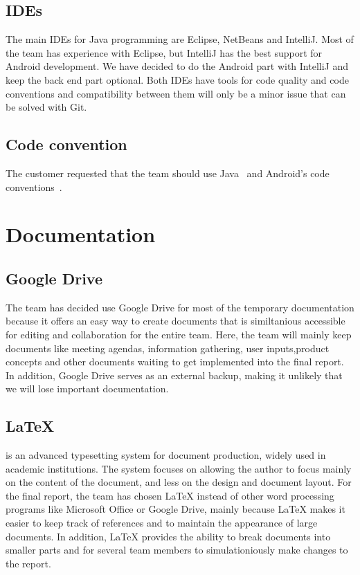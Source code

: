 \subsection{IDEs}
The main IDEs for Java programming are Eclipse, NetBeans and IntelliJ. Most of the team has experience with Eclipse, but IntelliJ has the best support for Android development.
We have decided to do the Android part with IntelliJ and keep the back end part optional. Both IDEs have tools for code quality and code conventions and compatibility between them will only be a minor issue that can be solved with Git.

\subsection{Code convention}
The customer requested that the team should use Java~\cite{javaconv} and Android's code conventions~\cite{androidconv}.

\section{Documentation}

\subsection{Google Drive}
The team has decided use Google Drive for most of the temporary documentation because it offers an easy way to create 
documents that is similtanious accessible for editing and collaboration for the entire team. Here, the team will mainly 
keep documents like meeting agendas, information gathering, user inputs,product concepts and other documents 
waiting to get implemented into the final report. 
In addition, Google Drive serves as an external backup, making it unlikely that we will lose important documentation. 


\subsection{\LaTeX}
\latex is an advanced typesetting system for document production, widely used in
academic institutions. The system focuses on allowing the author to focus mainly on the content of the document, 
and less on the design and document layout.
For the final report, the team has chosen LaTeX instead of other word processing programs like Microsoft Office or 
Google Drive, mainly because LaTeX makes it easier to keep track of references and to maintain the appearance of large
documents. In addition, LaTeX provides the ability to break documents into smaller parts and for several team 
members to simulationiously make changes to the report.


